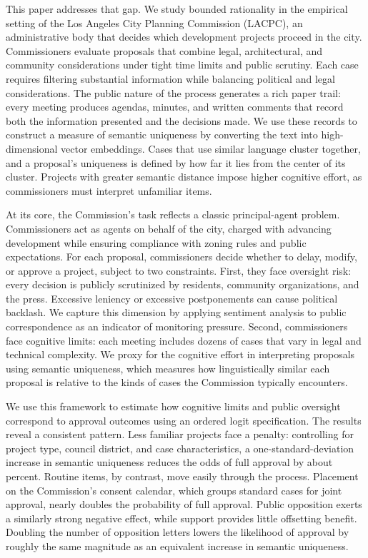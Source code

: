 This paper addresses that gap. We study bounded rationality in the empirical setting of the Los Angeles City Planning Commission (LACPC), an administrative body that decides which development projects proceed in the city. Commissioners evaluate proposals that combine legal, architectural, and community considerations under tight time limits and public scrutiny. Each case requires filtering substantial information while balancing political and legal considerations. The public nature of the process generates a rich paper trail: every meeting produces agendas, minutes, and written comments that record both the information presented and the decisions made. We use these records to construct a measure of semantic uniqueness by converting the text into high-dimensional vector embeddings. Cases that use similar language cluster together, and a proposal's uniqueness is defined by how far it lies from the center of its cluster. Projects with greater semantic distance impose higher cognitive effort, as commissioners must interpret unfamiliar items.

At its core, the Commission's task reflects a classic principal-agent problem. Commissioners act as agents on behalf of the city, charged with advancing development while ensuring compliance with zoning rules and public expectations. For each proposal, commissioners decide whether to delay, modify, or approve a project, subject to two constraints. First, they face oversight risk: every decision is publicly scrutinized by residents, community organizations, and the press. Excessive leniency or excessive postponements can cause political backlash. We capture this dimension by applying sentiment analysis to public correspondence as an indicator of monitoring pressure. Second, commissioners face cognitive limits: each meeting includes dozens of cases that vary in legal and technical complexity. We proxy for the cognitive effort in interpreting proposals using semantic uniqueness, which measures how linguistically similar each proposal is relative to the kinds of cases the Commission typically encounters. 

We use this framework to estimate how cognitive limits and public oversight correspond to approval outcomes using an ordered logit specification. The results reveal a consistent pattern. Less familiar projects face a penalty: controlling for project type, council district, and case characteristics, a one-standard-deviation increase in semantic uniqueness reduces the odds of full approval by about  percent. Routine items, by contrast, move easily through the process. Placement on the Commission's consent calendar, which groups standard cases for joint approval, nearly doubles the probability of full approval. Public opposition exerts a similarly strong negative effect, while support provides little offsetting benefit. Doubling the number of opposition letters lowers the likelihood of approval by roughly the same magnitude as an equivalent increase in semantic uniqueness.

